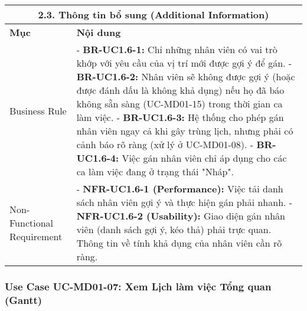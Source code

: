 \begin{longtable}{|m{4cm}|p{11cm}|}
\hline
\multicolumn{2}{|c|}{\textbf{2.3. Thông tin bổ sung (Additional Information)}} \\
\hline
\textbf{Mục} & \textbf{Nội dung} \\
\hline
Business Rule & - \textbf{BR-UC1.6-1:} Chỉ những nhân viên có vai trò khớp với yêu cầu của vị trí mới được gợi ý để gán. \newline - \textbf{BR-UC1.6-2:} Nhân viên sẽ không được gợi ý (hoặc được đánh dấu là không khả dụng) nếu họ đã báo không sẵn sàng (UC-MD01-15) trong thời gian ca làm việc. \newline - \textbf{BR-UC1.6-3:} Hệ thống cho phép gán nhân viên ngay cả khi gây trùng lịch, nhưng phải có cảnh báo rõ ràng (xử lý ở UC-MD01-08). \newline - \textbf{BR-UC1.6-4:} Việc gán nhân viên chỉ áp dụng cho các ca làm việc đang ở trạng thái "Nháp". \\
\hline
Non-Functional Requirement & - \textbf{NFR-UC1.6-1 (Performance):} Việc tải danh sách nhân viên gợi ý và thực hiện gán phải nhanh. \newline - \textbf{NFR-UC1.6-2 (Usability):} Giao diện gán nhân viên (danh sách gợi ý, kéo thả) phải trực quan. Thông tin về tính khả dụng của nhân viên cần rõ ràng. \\
\hline
\end{longtable}

\subsubsection{Use Case UC-MD01-07: Xem Lịch làm việc Tổng quan (Gantt)}


